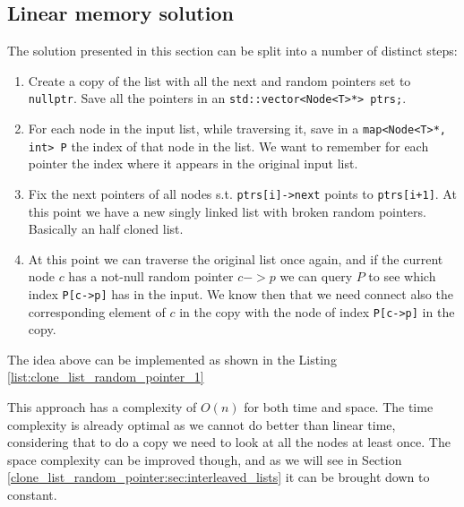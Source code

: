 \subsection{Linear memory solution}
\label{clone_list_random_pointer:sec:bruteforce}
The solution presented in this section can be split into a number of distinct steps:
\begin{enumerate}
	\item Create a copy of the list with all the  next and random pointers set to \lstinline[columns=fixed]{nullptr}. Save all the pointers in an \lstinline[columns=fixed]{std::vector<Node<T>*> ptrs;}.
	\item For each node in the input list, while traversing it, save in a \lstinline[columns=fixed]{map<Node<T>*, int> P} the index of that node in the list. We want to remember for each pointer the index where it appears in the original input list. 
	\item Fix the next pointers of all nodes s.t. \lstinline[columns=fixed]{ptrs[i]->next} points to  \lstinline[columns=fixed]{ptrs[i+1]}. At this point we have a new singly linked list with broken random pointers. Basically an half cloned list.
	\item At this point we can traverse the original list once again, and if the current node $c$ has a not-null random pointer $c->p$ we can query $P$ to see which index \lstinline[columns=fixed]{P[c->p]} has in the input. We know then that we need connect also the corresponding element of $c$ in the copy with the node of index \lstinline[columns=fixed]{P[c->p]} in the copy.
\end{enumerate}

The idea above can be implemented as shown in the Listing \ref{list:clone_list_random_pointer_1}




This approach has a complexity of $O(n)$ for both time and space. The time complexity is already optimal as we cannot do better than linear time, considering that to do a copy we need to look at all the nodes at least once. The space complexity can be improved though, and as we will see in Section \ref{clone_list_random_pointer:sec:interleaved_lists} it can be brought down to constant.


